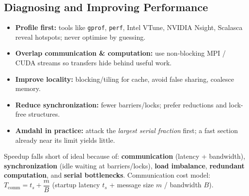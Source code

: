 \documentclass[11pt,a4paper]{article}
\begin{document}
\begin{center}
\end{center}

\subsection{Diagnosing and Improving Performance}
\begin{itemize}[leftmargin=*, itemsep=2pt]
  \item \textbf{Profile first:} tools like \texttt{gprof}, \texttt{perf}, Intel VTune, NVIDIA Nsight, Scalasca reveal hotspots; never optimise by guessing.
  \item \textbf{Overlap communication \& computation:} use non-blocking MPI / CUDA streams so transfers hide behind useful work.
  \item \textbf{Improve locality:} blocking/tiling for cache, avoid false sharing, coalesce memory.
  \item \textbf{Reduce synchronization:} fewer barriers/locks; prefer reductions and lock-free structures.
  \item \textbf{Amdahl in practice:} attack the \emph{largest serial fraction} first; a fast section already near its limit yields little.
\end{itemize}

\begin{alertbox}
Speedup falls short of ideal because of: \textbf{communication} (latency + bandwidth), \textbf{synchronization} (idle waiting at barriers/locks), \textbf{load imbalance}, \textbf{redundant computation}, and \textbf{serial bottlenecks}. Communication cost model: $T_{\text{comm}} = t_s + \dfrac{m}{B}$ (startup latency $t_s$ + message size $m$ / bandwidth $B$).
\end{alertbox}
\end{document}

